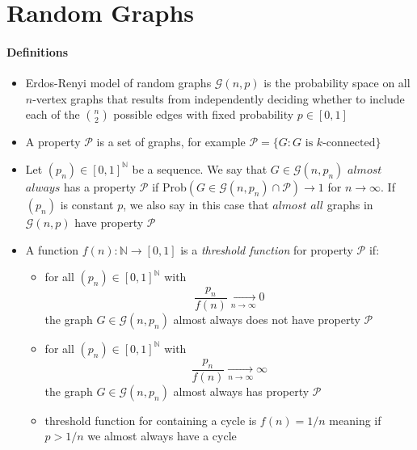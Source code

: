 \section{Random Graphs}
\paragraph{Definitions}
\begin{itemize}
    \item Erdos-Renyi model of random graphs $\mathcal{G}(n,p)$ is the 
    probability space on all $n$-vertex graphs that results from 
    independently deciding whether to include each of the $\binom{n}{2}$
    possible edges with fixed probability $p \in [0,1]$    

    \item A property $\mathcal{P}$ is a set of graphs, for example 
    $\mathcal{P} = \{G: G \text{ is } k\text{-connected}\}$

    \item Let $(p_n) \in [0,1]^{\mathbb{N}}$ be a sequence.
    We say that $G \in \mathcal{G}(n,p_n)$ $almost$ $always$ has a property
    $\mathcal{P}$ if Prob$(G \in \mathcal{G}(n,p_n) \cap \mathcal{P}) \to 1$
    for $n \to \infty$. If $(p_n)$ is constant $p$, we also say in this case
    that $almost$ $all$ graphs in $\mathcal{G}(n,p)$ have property
    $\mathcal{P}$

    \item A function $f(n): \mathbb{N} \to [0,1]$ is  a 
    \textit{threshold function} for property $\mathcal{P}$ if:
        \begin{itemize}
            \item for all $(p_n) \in [0,1]^{\mathbb{N}}$ with 
            $$\frac{p_n}{f(n)} \underset{n\to\infty}{\rightarrow} 0$$ the graph 
            $G \in \mathcal{G}(n,p_n)$ almost always does not have property 
            $\mathcal{P}$

            \item for all $(p_n) \in [0,1]^{\mathbb{N}}$ with 
            $$\frac{p_n}{f(n)} \underset{n\to\infty}{\rightarrow} \infty$$ 
            the graph  $G \in \mathcal{G}(n,p_n)$ almost always has property 
            $\mathcal{P}$

            \item threshold function for containing a cycle is $f(n) = 1/n$
            meaning if $p > 1/n$ we almost always have a cycle

        \end{itemize}
\end{itemize}


